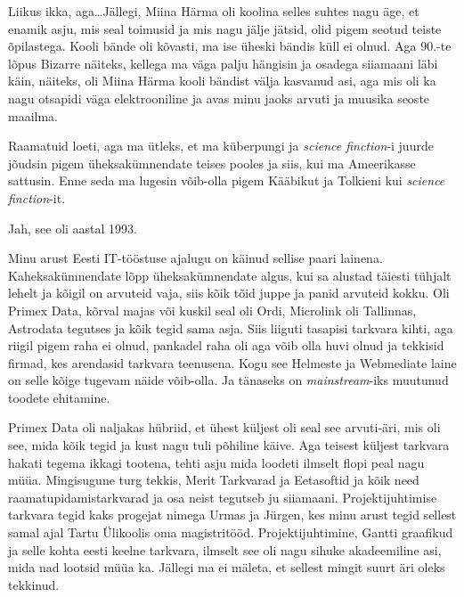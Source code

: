 Liikus ikka, aga\ldots Jällegi, Miina Härma oli koolina  selles suhtes nagu 
äge, et enamik asju, mis seal toimusid ja mis nagu jälje jätsid, olid pigem 
seotud 
teiste õpilastega. Kooli bände oli kõvasti, ma ise üheski bändis küll ei olnud. 
Aga 90.-te lõpus Bizarre näiteks, kellega ma väga palju hängisin 
ja osadega 
siiamaani läbi käin, näiteks, oli Miina Härma kooli bändist välja kasvanud 
asi, aga mis oli ka nagu otsapidi väga elektrooniline ja avas minu jaoks arvuti 
ja muusika seoste maailma. 

Raamatuid loeti, aga  ma ütleks, et ma küberpungi ja \emph{science finction}-i 
juurde jõudsin pigem üheksakümnendate teises pooles ja siis, kui ma Ameerikasse 
sattusin. Enne seda ma lugesin võib-olla  pigem Kääbikut ja Tolkieni kui 
\emph{science finction}-it.


Jah, see oli aastal 1993.


Minu arust Eesti IT-tööstuse ajalugu on käinud sellise paari lainena. 
Kaheksakümnendate lõpp üheksakümnendate algus, kui sa alustad 
täiesti tühjalt lehelt ja kõigil on arvuteid vaja, siis kõik tõid juppe ja panid 
arvuteid kokku. Oli Primex Data, kõrval majas või kuskil 
seal oli Ordi, Microlink oli Tallinnas, 
Astrodata tegutses ja kõik tegid sama asja. Siis liiguti 
tasapisi tarkvara kihti, aga riigil pigem raha ei olnud,  pankadel raha oli aga 
võib olla huvi olnud ja tekkisid firmad, kes arendasid tarkvara teenusena. Kogu 
see Helmeste ja Webmediate laine on selle kõige tugevam näide võib-olla. Ja  
tänaseks on \emph{mainstream}-iks  muutunud  toodete ehitamine. 

Primex Data oli naljakas hübriid,  et ühest küljest oli seal see arvuti-äri, 
mis oli see, mida kõik tegid ja kust nagu tuli põhiline käive. Aga teisest 
küljest tarkvara hakati tegema  ikkagi tootena, tehti asju mida loodeti ilmselt flopi peal nagu müüa. Mingisugune turg tekkis, 
Merit Tarkvarad ja 
Eetasoftid ja kõik need raamatupidamistarkvarad 
ja osa neist tegutseb ju siiamaani. Projektijuhtimise tarkvara tegid kaks 
progejat nimega Urmas ja Jürgen, kes  minu arust tegid sellest samal ajal Tartu 
Ülikoolis oma magistritööd. Projektijuhtimine, Gantti graafikud ja selle kohta 
eesti keelne tarkvara, ilmselt see oli nagu sihuke akadeemiline asi, mida nad 
lootsid müüa ka. Jällegi ma ei mäleta, et sellest mingit suurt äri oleks  
tekkinud. 

